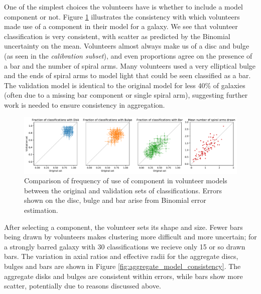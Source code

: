 \documentclass[../main.tex]{subfiles}
\begin{document}
One of the simplest choices the volunteers have is whether to include a model component or not. Figure \ref{fig:volunteer_component_consistency} illustrates the consistency with which volunteers made use of a component in their model for a galaxy. We see that volunteer classification is very consistent, with scatter as predicted by the Binomial uncertainty on the mean. Volunteers almost always make us of a disc and bulge (as seen in the \textit{calibration subset}), and even proportions agree on the presence of a bar and the number of spiral arms. Many volunteers used a very elliptical bulge and the ends of spiral arms to model light that could be seen classified as a bar. The validation model is identical to the original model for less 40\% of galaxies (often due to a missing bar component or single spiral arm), suggesting further work is needed to ensure consistency in aggregation.

\begin{figure}
  \includegraphics[width=17.3cm]{images__results/component_frequency.pdf}
  \caption{Comparison of frequency of use of component in volunteer models between the original and validation sets of classifications. Errors shown on the disc, bulge and bar arise from Binomial error estimation.}
  \label{fig:volunteer_component_consistency}
\end{figure}

After selecting a component, the volunteer sets its shape and size. Fewer bars being drawn by volunteers makes clustering more difficult and more uncertain; for a strongly barred galaxy with 30 classifications we recieve only 15 or so drawn bars. The variation in axial ratios and effective radii for the aggregate discs, bulges and bars are shown in Figure \ref{fig:aggregate_model_consistency}. The aggregate disks and bulges are consistent within errors, while bars show more scatter, potentially due to reasons discussed above.
\end{document}
